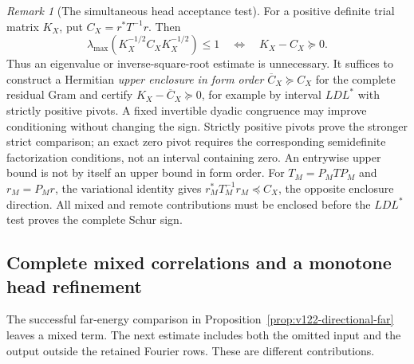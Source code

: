 \documentclass[11pt]{article}
\theoremstyle{remark}
\newtheorem{remark}[theorem]{Remark}
\begin{document}
\begin{remark}[The simultaneous head acceptance test]
\label{rem:v122-head-ldl}
For a positive definite trial matrix $K_X$, put
$C_X=r^*T^{-1}r$. Then
\[
 \lambda_{\max}(K_X^{-1/2}C_XK_X^{-1/2})\le1
 \quad\Longleftrightarrow\quad K_X-C_X\succeq0.
\]
Thus an eigenvalue or inverse-square-root estimate is unnecessary.
It suffices to construct a Hermitian \emph{upper enclosure in form
order} $\overline C_X\succeq C_X$ for the complete residual Gram
and certify $K_X-\overline C_X\succeq0$, for example by interval
$LDL^*$ with strictly positive pivots. A fixed invertible dyadic
congruence may improve conditioning without changing the sign.
Strictly positive pivots prove the stronger strict comparison;
an exact zero pivot requires the corresponding semidefinite
factorization conditions, not an interval containing zero.
An entrywise upper bound is not by itself an upper bound in form
order. For $T_M=P_MT P_M$ and $r_M=P_Mr$, the variational identity
gives $r_M^*T_M^{-1}r_M\preceq C_X$, the opposite enclosure
direction. All mixed and remote contributions must be enclosed
before the $LDL^*$ test proves the complete Schur sign.
\end{remark}

\subsection*{Complete mixed correlations and a monotone head refinement}

The successful far-energy comparison in
Proposition~\ref{prop:v122-directional-far} leaves a mixed term.
The next estimate includes both the omitted input and the output
outside the retained Fourier rows. These are different contributions.
\end{document}
